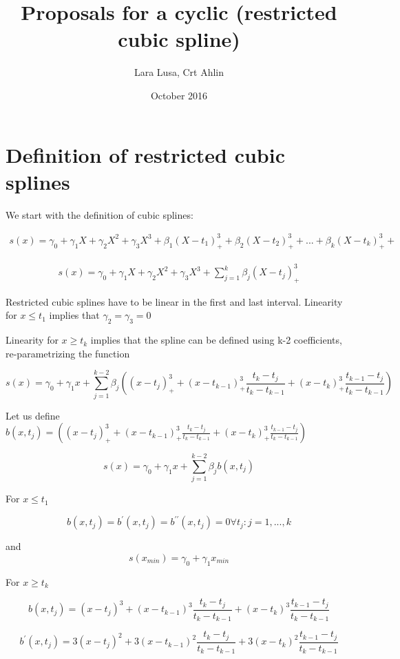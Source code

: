 \documentclass{article}
\author{Lara Lusa, Crt Ahlin}
\date{October 2016}
\title{Proposals for a cyclic (restricted cubic spline)}
\begin{document}
\maketitle

\section{Definition of restricted cubic splines}

We start with the definition of cubic splines: 

\begin{gather}
s(x)=\gamma_0+\gamma_1 X + \gamma_2 X^2 + \gamma_3 X^3 + \beta_1 (X-t_1)^3_{+}+ \beta_2 (X-t_2)^3_{+}+ ... +\beta_k (X-t_k)^3_{+}+
\end{gather}

\begin{gather}
s(x)=\gamma_0+\gamma_1 X + \gamma_2 X^2 + \gamma_3 X^3 + \sum_{j=1}^k\beta_j (X-t_j)^3_{+}
\end{gather}

Restricted cubic splines have to be linear in the first and last interval.
Linearity for $x\le t_1$ implies that $\gamma_2=\gamma_3=0$

Linearity for $x \ge t_k$ implies that the spline can be defined using k-2 coefficients, re-parametrizing the function

 
$$s(x)=\gamma_0+\gamma_1 x + \sum_{j=1}^{k-2}\beta_j \left((x-t_j)^3_{+}  +  (x-t_{k-1})^3_{+} \frac{t_k-t_j}{t_k-t_{k-1}} + (x-t_k)^3_{+} \frac{t_{k-1}-t_j}{t_k-t_{k-1}} \right)$$


Let us define $b(x, t_j)=\left((x-t_j)^3_{+}  +  (x-t_{k-1})^3_{+} \frac{t_k-t_j}{t_k-t_{k-1}} + (x-t_k)^3_{+} \frac{t_{k-1}-t_j}{t_k-t_{k-1}} \right) $


$$s(x)=\gamma_0+\gamma_1 x + \sum_{j=1}^{k-2}\beta_j b(x, t_j)$$


For $x \le t_1$ 

$$b(x, t_j)=b^{\prime}(x, t_j)=b^{\prime\prime}(x, t_j)=0 \forall t_j: j=1,...,k$$

and $$s(x_{min})=\gamma_0+\gamma_1 x_{min}$$


For $x \ge t_k$

$$b(x, t_j)=(x-t_j)^3  +  (x-t_{k-1})^3 \frac{t_k-t_j}{t_k-t_{k-1}} + (x-t_k)^3 \frac{t_{k-1}-t_j}{t_k-t_{k-1}}$$

$$b^{\prime}(x, t_j)=
3(x-t_j)^2  +  3(x-t_{k-1})^2 \frac{t_k-t_j}{t_k-t_{k-1}} + 3(x-t_k)^2 \frac{t_{k-1}-t_j}{t_k-t_{k-1}}$$
\end{document}
